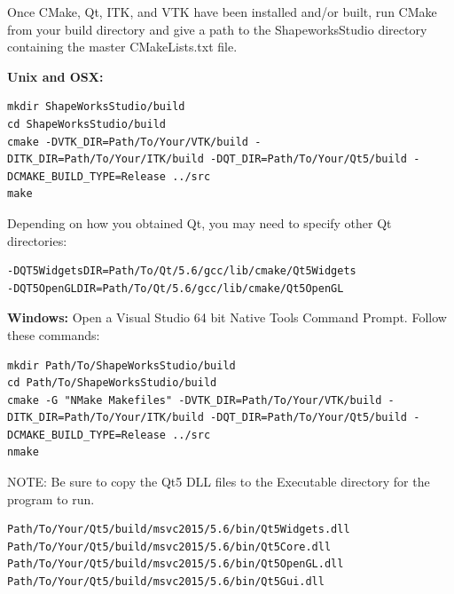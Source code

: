 \documentclass[letterpaper,12pt]{article}   %
\begin{document}
Once CMake, Qt, ITK, and VTK have been installed and/or built, run CMake from your build directory and give a path to the ShapeworksStudio directory containing the master CMakeLists.txt file.

\vspace{0.1in}
\noindent\textbf{Unix and OSX:}

\begin{lstlisting}[style=BashInputStyle]
mkdir ShapeWorksStudio/build
cd ShapeWorksStudio/build
cmake -DVTK_DIR=Path/To/Your/VTK/build -DITK_DIR=Path/To/Your/ITK/build -DQT_DIR=Path/To/Your/Qt5/build -DCMAKE_BUILD_TYPE=Release ../src
make
\end{lstlisting}

Depending on how you obtained Qt, you may need to specify other Qt directories:

\begin{lstlisting}[style=BashInputStyle]
-DQT5WidgetsDIR=Path/To/Qt/5.6/gcc/lib/cmake/Qt5Widgets
-DQT5OpenGLDIR=Path/To/Qt/5.6/gcc/lib/cmake/Qt5OpenGL
\end{lstlisting}

\vspace{0.1in}
\noindent\textbf{Windows:} Open a Visual Studio 64 bit Native Tools Command Prompt. Follow these commands:

\begin{lstlisting}[style=BashInputStyle]
mkdir Path/To/ShapeWorksStudio/build
cd Path/To/ShapeWorksStudio/build
cmake -G "NMake Makefiles" -DVTK_DIR=Path/To/Your/VTK/build -DITK_DIR=Path/To/Your/ITK/build -DQT_DIR=Path/To/Your/Qt5/build -DCMAKE_BUILD_TYPE=Release ../src
nmake
\end{lstlisting}

\noindent NOTE: Be sure to copy the Qt5 DLL files to the Executable directory for the program to run.

\begin{lstlisting}[style=BashInputStyle]
Path/To/Your/Qt5/build/msvc2015/5.6/bin/Qt5Widgets.dll
Path/To/Your/Qt5/build/msvc2015/5.6/bin/Qt5Core.dll
Path/To/Your/Qt5/build/msvc2015/5.6/bin/Qt5OpenGL.dll
Path/To/Your/Qt5/build/msvc2015/5.6/bin/Qt5Gui.dll
\end{lstlisting}
\end{document}
